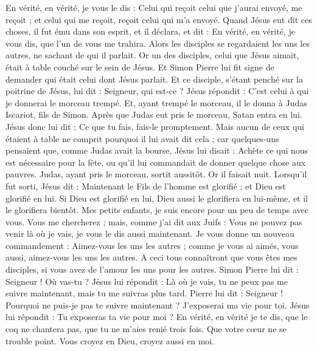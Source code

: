\begin{multicols}{2}
En vérité, en vérité, je vous le dis : Celui qui reçoit celui que j'aurai envoyé, me reçoit ; et celui qui me reçoit, reçoit celui qui m'a envoyé.
Quand Jésus eut dit ces choses, il fut ému dans son esprit, et il déclara, et dit : En vérité, en vérité, je vous dis, que l'un de vous me trahira.
Alors les disciples se regardaient les uns les autres, ne sachant de qui il parlait.
Or un des disciples, celui que Jésus aimait, était à table couché sur le sein de Jésus.
Et Simon Pierre lui fit signe de demander qui était celui dont Jésus parlait.
Et ce disciple, s'étant penché sur la poitrine de Jésus, lui dit : Seigneur, qui est-ce ?
Jésus répondit : C'est celui à qui je donnerai le morceau trempé. Et, ayant trempé le morceau, il le donna à Judas Iscariot, fils de Simon.
Après que Judas eut pris le morceau, Satan entra en lui. Jésus donc lui dit : Ce que tu fais, fais-le promptement.
Mais aucun de ceux qui étaient à table ne comprit pourquoi il lui avait dit cela ;
car quelques-uns pensaient que, comme Judas avait la bourse, Jésus lui disait : Achète ce qui nous est nécessaire pour la fête, ou qu'il lui commandait de donner quelque chose aux pauvres.
Judas, ayant pris le morceau, sortit aussitôt. Or il faisait nuit.
Lorsqu'il fut sorti, Jésus dit : Maintenant le Fils de l'homme est glorifié ; et Dieu est glorifié en lui.
Si Dieu est glorifié en lui, Dieu aussi le glorifiera en lui-même, et il le glorifiera bientôt.
Mes petits enfants, je suis encore pour un peu de temps avec vous. Vous me chercherez ; mais, comme j'ai dit aux Juifs : Vous ne pouvez pas venir là où je vais, je vous le dis aussi maintenant.
Je vous donne un nouveau commandement : Aimez-vous les uns les autres ; comme je vous ai aimés, vous aussi, aimez-vous les uns les autres.
A ceci tous connaîtront que vous êtes mes disciples, si vous avez de l'amour les uns pour les autres.
Simon Pierre lui dit : Seigneur ! Où vas-tu ? Jésus lui répondit : Là où je vais, tu ne peux pas me suivre maintenant, mais tu me suivras plus tard.
Pierre lui dit : Seigneur ! Pourquoi ne puis-je pas te suivre maintenant ? J'exposerai ma vie pour toi.
Jésus lui répondit : Tu exposeras ta vie pour moi ? En vérité, en vérité je te dis, que le coq ne chantera pas, que tu ne m'aies renié trois fois.
\VerseOne{}Que votre cœur ne se trouble point. Vous croyez en Dieu, croyez aussi en moi.

\end{multicols}
